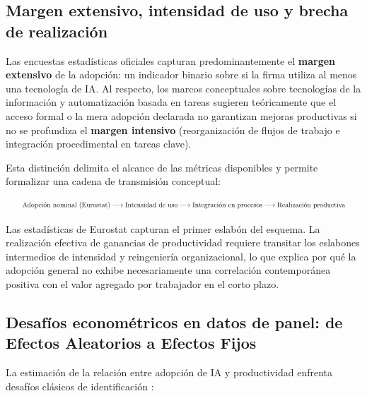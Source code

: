\documentclass[12pt,a4paper]{article}
\begin{document}
\subsection{Margen extensivo, intensidad de uso y brecha de realización}

Las encuestas estadísticas oficiales capturan predominantemente el \textbf{margen extensivo} de la adopción: un indicador binario sobre si la firma utiliza al menos una tecnología de IA. Al respecto, los marcos conceptuales sobre tecnologías de la información \citep{bresnahan2002information} y automatización basada en tareas \citep{acemoglu2018race} sugieren teóricamente que el acceso formal o la mera adopción declarada no garantizan mejoras productivas si no se profundiza el \textbf{margen intensivo} (reorganización de flujos de trabajo e integración procedimental en tareas clave).

Esta distinción delimita el alcance de las métricas disponibles y permite formalizar una cadena de transmisión conceptual:

\begin{equation*}
  \resizebox{0.95\textwidth}{!}{$\text{Adopción nominal (Eurostat)} \longrightarrow \text{Intensidad de uso} \longrightarrow \text{Integración en procesos} \longrightarrow \text{Realización productiva}$}
\end{equation*}

Las estadísticas de Eurostat capturan el primer eslabón del esquema. La realización efectiva de ganancias de productividad requiere transitar los eslabones intermedios de intensidad y reingeniería organizacional, lo que explica por qué la adopción general no exhibe necesariamente una correlación contemporánea positiva con el valor agregado por trabajador en el corto plazo.

\subsection{Desafíos econométricos en datos de panel: de Efectos Aleatorios a Efectos Fijos}

La estimación de la relación entre adopción de IA y productividad enfrenta desafíos clásicos de identificación \citep{wooldridge2010econometric, berndt1991practice}:
\end{document}
